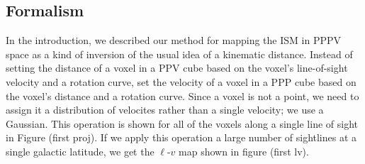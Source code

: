


\subsection{Formalism}
\label{sec:KT-method}
In the introduction, we described our method for mapping the ISM in PPPV space as a kind of inversion of the usual idea of a kinematic distance. Instead of setting the distance of a voxel in a PPV cube based on the voxel's line-of-sight velocity and a rotation curve, set the velocity of a voxel in a PPP cube based on the voxel's distance and a rotation curve. Since a voxel is not a point, we need to assign it a distribution of velocites rather than a single velocity; we use a Gaussian. This operation is shown for all of the voxels along a single line of sight in Figure (first proj). If we apply this operation a large number of sightlines at a single galactic latitude, we get the $\ell$-$v$ map shown in figure (first lv). 


